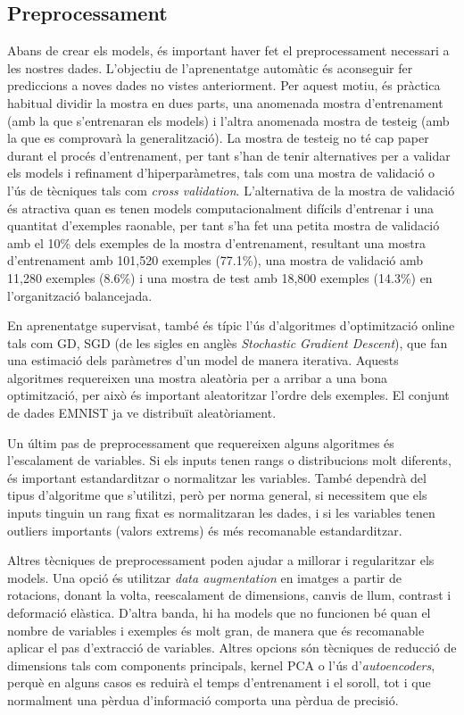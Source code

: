 \documentclass[12pt, spanish]{article}
\begin{document}
\subsection{Preprocessament}

Abans de crear els models, és important haver fet el preprocessament necessari a les nostres dades. L'objectiu de l'aprenentatge automàtic és aconseguir fer prediccions a noves dades no vistes anteriorment. Per aquest motiu, és pràctica habitual dividir la mostra en dues parts, una anomenada mostra d'entrenament (amb la que s'entrenaran els models) i l'altra anomenada mostra de testeig (amb la que es comprovarà la generalització). La mostra de testeig no té cap paper durant el procés d'entrenament, per tant s'han de tenir alternatives per a validar els models i refinament d'hiperparàmetres, tals com una mostra de validació o l'ús de tècniques tals com \textit{cross validation}. L'alternativa de la mostra de validació és atractiva quan es tenen models computacionalment difícils d'entrenar i una quantitat d'exemples raonable, per tant s'ha fet una petita mostra de validació amb el 10\% dels exemples de la mostra d'entrenament, resultant una mostra d'entrenament amb 101,520 exemples (77.1\%), una mostra de validació amb 11,280 exemples (8.6\%) i una mostra de test amb 18,800 exemples (14.3\%) en l'organització balancejada.

En aprenentatge supervisat, també és típic l'ús d'algoritmes d'optimització online tals com GD, SGD (de les sigles en anglès \textit{Stochastic Gradient Descent}), que fan una estimació dels paràmetres d'un model de manera iterativa. Aquests algoritmes requereixen una mostra aleatòria per a arribar a una bona optimització, per això és important aleatoritzar l'ordre dels exemples. El conjunt de dades EMNIST ja ve distribuït aleatòriament. 

Un últim pas de preprocessament que requereixen alguns algoritmes és l'escalament de variables. Si els inputs tenen rangs o distribucions molt diferents, és important estandarditzar o normalitzar les variables. També dependrà del tipus d'algoritme que s'utilitzi, però per norma general, si necessitem que els inputs tinguin un rang fixat es normalitzaran les dades, i si les variables tenen outliers importants (valors extrems) és més recomanable estandarditzar.

Altres tècniques de preprocessament poden ajudar a millorar i regularitzar els models. Una opció és utilitzar \textit{data augmentation} en imatges a partir de rotacions, donant la volta, reescalament de dimensions, canvis de llum, contrast i deformació elàstica. D'altra banda, hi ha models que no funcionen bé quan el nombre de variables i exemples és molt gran, de manera que és recomanable aplicar el pas d'extracció de variables. Altres opcions són tècniques de reducció de dimensions tals com components principals, kernel PCA o l'ús d'\textit{autoencoders}, perquè en alguns casos es reduirà el temps d'entrenament i el soroll, tot i que normalment una pèrdua d'informació comporta una pèrdua de precisió.
\end{document}
